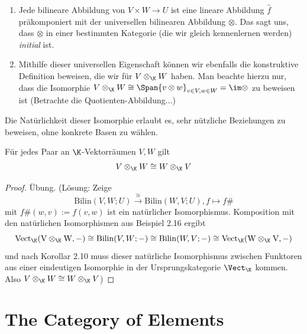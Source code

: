 \documentclass[11pt]{article}
\begin{document}
\begin{note}[zu Beispiel 2.16] \mbox{}
    \begin{enumerate}[label=-]
        \item Jede bilineare Abbildung von $V\times W\to U$ ist eine lineare Abbildung $\hat{f}$ präkomponiert mit der universellen bilinearen Abbildung $\otimes$. Das sagt uns, dass $\otimes$ in einer bestimmten Kategorie (die wir gleich kennenlernen werden) \emph{initial} ist.
        \item Mithilfe dieser universellen Eigenschaft können wir ebenfalls die konstruktive Definition beweisen, die wir für $V\otimes_\K W$ haben. Man beachte hierzu nur, dass die Isomorphie $V\otimes_\K W \cong \Span{v\otimes w}_{v\in V, w\in W}=\im \otimes$ zu beweisen ist (Betrachte die Quotienten-Abbildung...)
    \end{enumerate}
\end{note}

Die Natürlichkeit dieser Isomorphie erlaubt es, sehr nützliche Beziehungen zu beweisen, ohne konkrete Basen zu wählen.
\begin{lemma}
Für jedes Paar an $\K$-Vektorräumen $V,W$ gilt $$V\otimes_\K W\cong W\otimes_\K V$$
\end{lemma}
\begin{proof}
    Übung. (Lösung: Zeige $$\mathrm{Bilin}(V,W;U) \overset\cong\longrightarrow\mathrm{Bilin}(W,V;U), f\mapsto f\#$$ mit $f\#(w,v):= f(v,w)$ ist ein natürlicher Isomorphismus. Komposition mit den natürlichen Isomorphismen aus Beispiel 2.16 ergibt 
    $$\mathrm{Vect_\K(V\otimes_\K W}, -)\cong \mathrm{Bilin}(V,W;-) \cong\mathrm{Bilin}(W,V;-)\cong \mathrm{Vect_\K(W\otimes_\K V}, -)$$
    und nach Korollar 2.10 muss dieser natürliche Isomorphismus zwischen Funktoren aus einer eindeutigen Isomorphie in der Ursprungskategorie $\Vect_\K $ kommen. Also $V\otimes_\K W \cong W\otimes_\K V$)
\end{proof}

\newpage
\section{The Category of Elements}
\end{document}
